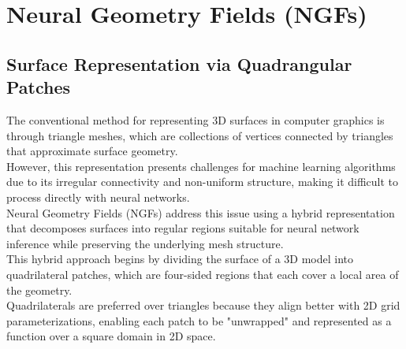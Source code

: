 \section{Neural Geometry Fields (NGFs)}\label{Sec:MainPart}

\subsection{Surface Representation via Quadrangular Patches}

The conventional method for representing 3D surfaces in computer graphics is through triangle meshes, which are collections of vertices connected by triangles that approximate surface geometry. \\
However, this representation presents challenges for machine learning algorithms due to its irregular connectivity and non-uniform structure, making it difficult to process directly with neural networks. \\
Neural Geometry Fields (NGFs) address this issue using a hybrid representation that decomposes surfaces into regular regions suitable for neural network inference while preserving the underlying mesh structure. \\

This hybrid approach begins by dividing the surface of a 3D model into quadrilateral patches, which are four-sided regions that each cover a local area of the geometry. \\
Quadrilaterals are preferred over triangles because they align better with 2D grid parameterizations, enabling each patch to be "unwrapped" and represented as a function over a square domain in 2D space. \\

